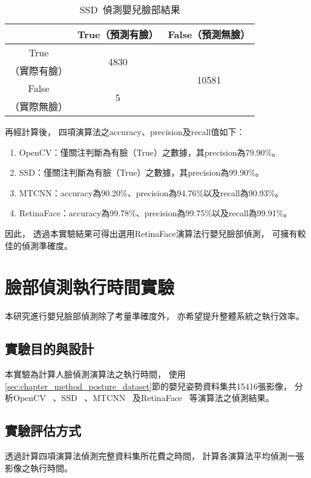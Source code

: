 \documentclass[class=NCU_thesis, crop=false]{standalone}
\begin{document}
\begin{table}[h]
    \centering
    \caption{SSD~\cite{ye_face_2021}偵測嬰兒臉部結果}
    \label{table:table-ssd}
    \begin{tabular}{ccc}
    \hline
     & True（預測有臉）& False（預測無臉）\\
    \hline
    True & \multirow{2}{*}{4830} & \multirow{4}{*}{10581} \\
    （實際有臉）& & \\
    False & \multirow{2}{*}{5} & \\
    （實際無臉）&  & \\
    \hline
    \end{tabular}
\end{table}

再經計算後，
四項演算法之accuracy、precision及recall值如下：
\begin{enumerate}
    \item OpenCV：僅關注判斷為有臉（True）之數據，其precision為79.90\%。
    \item SSD：僅關注判斷為有臉（True）之數據，其precision為99.90\%。
    \item MTCNN：accuracy為90.20\%、precision為94.76\%以及recall為90.93\%。
    \item RetinaFace：accuracy為99.78\%、precision為99.75\%以及recall為99.91\%。
\end{enumerate}

因此，
透過本實驗結果可得出選用RetinaFace演算法行嬰兒臉部偵測，
可擁有較佳的偵測準確度。

\section{臉部偵測執行時間實驗}
\label{sec:chapter_experiment_face_time}
本研究進行嬰兒臉部偵測除了考量準確度外，
亦希望提升整體系統之執行效率。

\subsection{實驗目的與設計}
本實驗為計算人臉偵測演算法之執行時間，
使用\ref{sec:chapter_method_posture_dataset}節的嬰兒姿勢資料集共15416張影像，
分析OpenCV~\cite{goyal_face_2017}
、SSD~\cite{ye_face_2021}
、MTCNN~\cite{zhang_joint_2016}
及RetinaFace~\cite{deng_retinaface_2020}
等演算法之偵測結果。

\subsection{實驗評估方式}
透過計算四項演算法偵測完整資料集所花費之時間，
計算各演算法平均偵測一張影像之執行時間。
\end{document}
